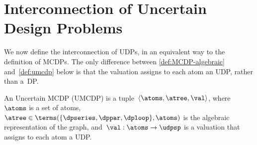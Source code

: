\section{Interconnection of Uncertain Design Problems\label{sec:UMCDP}}

We now define the interconnection of UDPs, in an equivalent way to
the definition of MCDPs. The only difference between \cref{def:MCDP-algebraic}
and~\cref{def:umcdp} below is that the valuation assigns to
each atom an UDP, rather than a~DP.
\begin{definition}
  \label{def:umcdp}An Uncertain MCDP (UMCDP) is a tuple~$\left\langle \atoms,\atree,\val\right\rangle $,
  where~$\atoms$ is a set of atoms,~$\atree\in\terms(\{\dpseries,\dppar,\dploop\},\atoms)$
  is the algebraic representation of the graph, and~$\val:\atoms\rightarrow\udpsp$
  is a valuation that assigns to each atom a UDP.
\end{definition}


